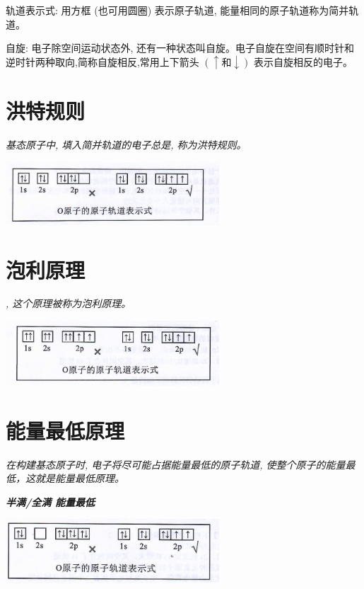\documentclass[10pt,cn]{elegantbook}
\begin{document}
	 轨道表示式: 用方框 (也可用圆圈) 表示原子轨道, 能量相同的原子轨道称为简并轨道。
	 
	 自旋: 电子除空间运动状态外, 还有一种状态叫自旋。电子自旋在空间有顺时针和逆时针两种取向,简称自旋相反,常用上下箭头 \(\left( { \uparrow \text{和} \downarrow }\right)\) 表示自旋相反的电子。
	 
	 \section{ 洪特规则}
	 \textit{ 基态原子中, 填入简并轨道的电子总是, 称为洪特规则。}
	  
	  	 \begin{center}
	  	\includegraphics[max width=0.6\textwidth]{image/c54-1.jpg}
	  \end{center}
	  
	 \section{泡利原理}
	 
	 \textit{, 这个原理被称为泡利原理。}
	
	 	 \begin{center}
	 	\includegraphics[max width=0.6\textwidth]{image/c54-2.jpg}
	 \end{center}

	 
	 \section{能量最低原理}
	 
	  \textit{在构建基态原子时, 电子将尽可能占据能量最低的原子轨道, 使整个原子的能量最低，这就是能量最低原理。 }
	  
	  \textbf{\textit{半满/全满 能量最低}}
	 
	 \begin{center}
	 	\includegraphics[max width=0.6\textwidth]{image/c54-3.jpg}
	 \end{center}
	 
\end{document}
